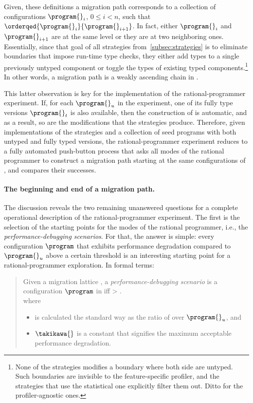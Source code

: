 Given, these definitions a migration path corresponds to a collection of
configurations  $\program{}_i$, $0 \leq  i < n$, such that
$\orderqed{\program{}_i}{\program{}_{i+1}}$. In fact, either  $\program{}_i$
and $\program{}_{i+1}$ are at the same level or they are at two
neighboring ones.  Essentially, since that goal of all strategies
from~\ref{subsec:strategies} is to eliminate  boundaries that impose
run-time type checks, they either add types to a single previously
untyped component or toggle the types of existing typed
components.\footnote{None of the strategies modifies a boundary where both
side are untyped. Such boundaries are invisible to the feature-specific
profiler, and the strategies that use the statistical one explicitly
filter them out. Ditto for the profiler-agnostic ones.} 
In other words, a migration path is a weakly ascending
chain in .

This latter observation is key for the implementation of the
rational-programmer experiment. If, for each  $\program{}_u$ in the
experiment, one of its fully type versions $\program{}_t$ is also
available, then the construction of  is
automatic, and as a result, so are the modifications that the strategies 
produce. Therefore, given implementations of the strategies and a
collection of seed programs with both untyped and fully typed versions,
the rational-programmer experiment reduces to a fully automated push-button 
process that asks all modes of the rational programmer to
construct a migration path starting at the same configurations of   
, and compares their successes. 

\paragraph{The beginning and end of a migration path.}
The discussion reveals the two remaining unanswered questions for a complete
operational description of the rational-programmer experiment. The first
 is the selection of the starting points for the modes of the rational
programmer, i.e., the \emph{performance-debugging scenarios}. 
For that, the answer is simple: 
every configuration $\program$ that exhibits performance degradation compared to 
$\program{}_u$ above a certain threshold is an interesting starting point
for a rational-programmer exploration. In formal terms: 

\begin{quote} \em

Given a migration lattice ,
a \emph{performance-debugging scenario} is a configuration $\program$ in  
iff
 > \takikawa{}.\\
 where 
  \begin{itemize}
   \item \slowdownkw{} is calculated the standard way as the ratio of \program{} over $\program{}_u$, and
   \item $\takikawa{}$ is a constant that signifies the maximum acceptable performance degradation.
  \end{itemize}
\end{quote}


